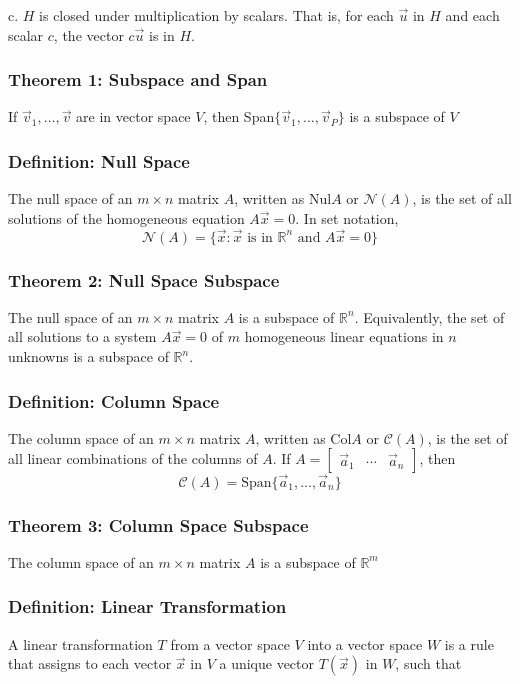 \documentclass{article}
\begin{document}
c. $H$ is closed under multiplication by scalars. That is, for each $\vec u$ in $H$ and \indent each scalar $c$, the vector $c \vec u$ is in $H$.

\subsubsection*{Theorem 1: Subspace and Span}
If $\vec v_1 , \dots , \vec v$ are in vector space $V$, then Span$\{ \vec v_1 , \dots , \vec v_P \}$ is a subspace of $V$

\subsubsection*{Definition: Null Space}
The null space of an $m \times n$ matrix $A$, written as Nul$A$ or $\mathcal{N}(A)$, is the set of all solutions of the homogeneous equation $A \vec x = 0$. In set notation,
$$\mathcal{N} (A) = \{\vec x: \vec x \text{ is in }\mathbb{R}^n \text{ and } A \vec x = 0 \}$$

\subsubsection*{Theorem 2: Null Space Subspace}
The null space of an $m \times n$ matrix $A$ is a subspace of $\mathbb{R}^n$. Equivalently, the set of all solutions to a system $A\vec x = 0$ of $m$ homogeneous linear equations in $n$ unknowns is a subspace of $\mathbb{R}^n$.

\subsubsection*{Definition: Column Space}
The column space of an $m \times n$ matrix $A$, written as $\text{Col}A$ or $\mathcal{C}(A)$, is the set of all linear combinations of the columns of $A$. If $A= \begin{bmatrix}
    \vec a_1 & \cdots & \vec a_n
\end{bmatrix}$, then 
$$\mathcal{C}(A) = \text{Span}\{ \vec a_1, \dots , \vec a_n \}$$

\subsubsection*{Theorem 3: Column Space Subspace}
The column space of an $m \times n$ matrix $A$ is a subspace of $\mathbb{R}^m$

\subsubsection*{Definition: Linear Transformation}
A linear transformation $T$ from a vector space $V$ into a vector space $W$ is a rule that assigns to each vector $\vec x$ in $V$ a unique vector $T(\vec x)$ in $W$, such that
\end{document}
